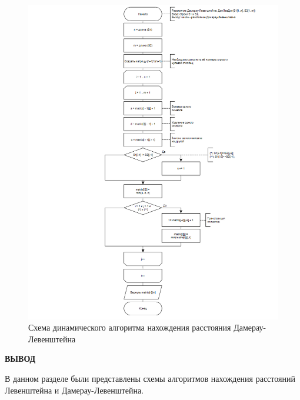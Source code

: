 \begin{figure}[h]
	\centering
	\includegraphics[scale=0.6]{images/dam-lev_dyn.png}
	\caption{Схема динамического алгоритма нахождения расстояния Дамерау-Левенштейна}
	\label{fig:DLRec}
\end{figure}

\clearpage

\textbf{ВЫВОД}

 В данном разделе были представлены схемы алгоритмов нахождения расстояний Левенштейна и Дамерау-Левенштейна.

\clearpage